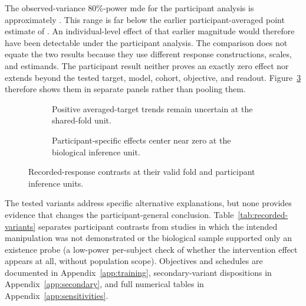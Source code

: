 The observed-variance 80\%-power \ac{mde} for the participant analysis is approximately .
This range is far below the earlier participant-averaged point estimate of .
An individual-level effect of that earlier magnitude would therefore have been detectable under the participant analysis.
The comparison does not equate the two results because they use different response constructions, scales, and estimands.
The participant result neither proves an exactly zero effect nor extends beyond the tested target, model, cohort, objective, and readout.
Figure~\ref{fig:recorded-response-inference} therefore shows them in separate panels rather than pooling them.

\begin{figure}[H]
  \centering
  \begin{subfigure}[t]{\textwidth}
    \centering
    \resizebox{\linewidth}{!}{}
    \par\vspace{0.45em}
    \caption{Positive averaged-target trends remain uncertain at the shared-fold unit.}
    \label{fig:recorded-response-averaged}
  \end{subfigure}
  \par\smallskip
  \begin{subfigure}[t]{\textwidth}
    \centering
    \resizebox{\linewidth}{!}{}
    \par\vspace{0.45em}
    \caption{Participant-specific effects center near zero at the biological inference unit.}
    \label{fig:recorded-response-participant}
  \end{subfigure}
  \caption{Recorded-response contrasts at their valid fold and participant inference units.}
  \label{fig:recorded-response-inference}
\end{figure}
\FloatBarrier

The tested variants address specific alternative explanations, but none provides evidence that changes the participant-general conclusion.
Table~\ref{tab:recorded-variants} separates participant contrasts from studies in which the intended manipulation was not demonstrated or the biological sample supported only an existence probe (a low-power per-subject check of whether the intervention effect appears at all, without population scope).
Objectives and schedules are documented in Appendix~\ref{app:training}, secondary-variant dispositions in Appendix~\ref{app:secondary}, and full numerical tables in Appendix~\ref{app:sensitivities}.

